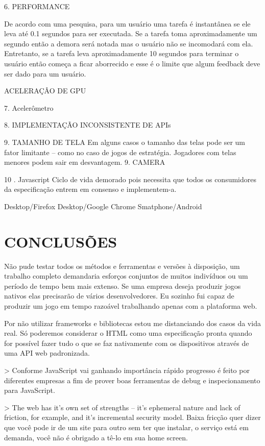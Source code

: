 \documentclass[11pt,a4paper]{article}
\begin{document}
6. PERFORMANCE

De acordo com uma pesquisa, para um usuário uma tarefa é instantânea se ele leva até 0.1 segundos para ser executada. Se a tarefa toma aproximadamente um segundo então a demora será notada mas o usuário não se incomodará com ela. Entretanto, se a tarefa leva aproximadamente 10 segundos para terminar o usuário então começa a ficar aborrecido e esse é o limite que algum feedback deve ser dado para um usuário.

ACELERAÇÂO DE GPU

7. Acelerômetro

8. IMPLEMENTAÇÃO INCONSISTENTE DE APIs

9.  TAMANHO DE TELA
Em alguns casos o tamanho das telas pode ser um fator limitante – como no caso de jogos de estratégia. Jogadores com telas menores podem sair em desvantagem.
9.  CAMERA

10 . Javascript
Ciclo de vida demorado pois necessita que todos os consumidores da especificação entrem em consenso e implementem-a.

Desktop/Firefox
Desktop/Google Chrome
Smatphone/Android

\chapter{CONCLUSÕES}

Não pude testar todos os métodos e ferramentas e versões à disposição, um trabalho completo demandaria esforços conjuntos de muitos indivíduos ou um período de tempo bem mais extenso. Se uma empresa deseja produzir jogos nativos elas precisarão de vários desenvolvedores. Eu sozinho fui capaz de produzir um jogo em tempo razoável trabalhando apenas com a plataforma web.

Por não utilizar frameworks e bibliotecas estou me distanciando dos casos da vida real.
Só poderemos considerar o HTML como uma especificação pronta quando for possível fazer tudo o que se faz nativamente com os dispositivos através de uma API web padronizada.

> Conforme JavaScript vai ganhando importância rápido progresso é feito por diferentes empresas a fim de prover boas ferramentas de debug e inspecionamento para JavaScript.

>  The web has it's own set of strengths – it's ephemeral nature and lack of friction, for example, and it's incremental security model. 
Baixa fricção quer dizer que você pode ir de um site para outro sem ter que instalar, o serviço está em demanda, você não é obrigado a tê-lo em sua home screen.
\end{document}
